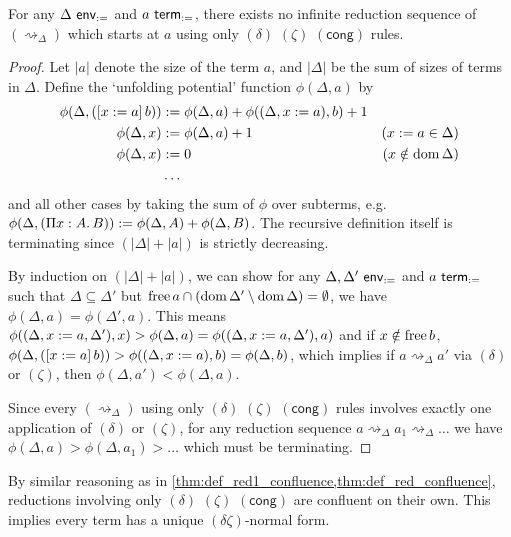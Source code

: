 \documentclass[twoside]{report}
\begin{document}
\begin{proposition}
\label{thm:def_delta_zeta_termination}
For any $\Delta \ \mathsf{env}_{:=}$ and $a \ \mathsf{term}_{:=}$, there exists no infinite reduction sequence of $(\rightsquigarrow_\Delta)$ which starts at $a$ using only $(\delta)$ $(\zeta)$ $(\mathsf{cong})$ rules.
\end{proposition}

\begin{proof}
Let $|a|$ denote the size of the term $a$, and $|\Delta|$ be the sum of sizes of terms in $\Delta$. Define the `unfolding potential' function $\phi(\Delta, a)$ by
$$
\begin{aligned}
\phi(\Delta, ([{x}:={a}]\,{b})) &:= \phi(\Delta, a) + \phi((\Delta, x := a), b) + 1 \\
\phi(\Delta, x) &:= \phi(\Delta, a) + 1 & (x := a \in \Delta) \\
\phi(\Delta, x) &:= 0 & (x\notin\operatorname{dom}\Delta) \\
&\ldots
\end{aligned}
$$
and all other cases by taking the sum of $\phi$ over subterms, e.g. $\phi(\Delta, (\Pi{x} : {A}.\,{B})) := \phi(\Delta, A) + \phi(\Delta, B)$. The recursive definition itself is terminating since $(|\Delta| + |a|)$ is strictly decreasing.

By induction on $(|\Delta| + |a|)$, we can show for any $\Delta, \Delta' \ \mathsf{env}_{:=}$ and $a \ \mathsf{term}_{:=}$ such that $\Delta\subseteq\Delta'$ but $\operatorname{free} a \cap (\operatorname{dom} \Delta' \setminus \operatorname{dom} \Delta) = \emptyset$, we have $\phi(\Delta, a) = \phi(\Delta', a)$. This means $\phi((\Delta, x := a, \Delta'), x) > \phi(\Delta, a) = \phi((\Delta, x := a, \Delta'), a)$ and if $x \notin \operatorname{free} b$, $\phi(\Delta, ([{x}:={a}]\,{b})) > \phi((\Delta, x := a), b) = \phi(\Delta, b)$, which implies if $a \rightsquigarrow_\Delta a'$ via $(\delta)$ or $(\zeta)$, then $\phi(\Delta, a') < \phi(\Delta, a)$.

Since every $(\rightsquigarrow_\Delta)$ using only $(\delta)$ $(\zeta)$ $(\mathsf{cong})$ rules involves exactly one application of $(\delta)$ or $(\zeta)$, for any reduction sequence $a \rightsquigarrow_\Delta a_1 \rightsquigarrow_\Delta \ldots$ we have $\phi(\Delta, a) > \phi(\Delta, a_1) > \ldots$ which must be terminating.
\end{proof}

By similar reasoning as in \cref{thm:def_red1_confluence,thm:def_red_confluence}, reductions involving only $(\delta)$ $(\zeta)$ $(\mathsf{cong})$ are confluent on their own. This implies every term has a unique $(\delta\zeta)$-normal form.
\end{document}
